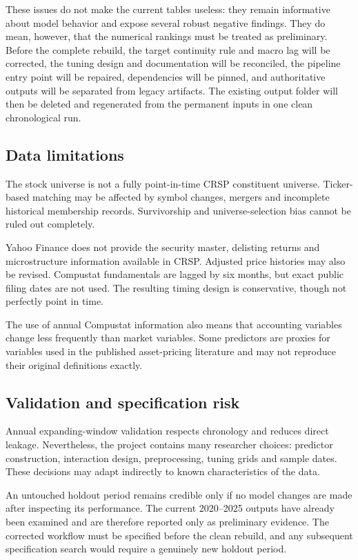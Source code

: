 \documentclass[11pt,a4paper]{article}
\begin{document}
These issues do not make the current tables useless: they remain informative
about model behavior and expose several robust negative findings. They do mean,
however, that the numerical rankings must be treated as preliminary. Before the
complete rebuild, the target continuity rule and macro lag will be corrected,
the tuning design and documentation will be reconciled, the pipeline entry
point will be repaired, dependencies will be pinned, and authoritative outputs
will be separated from legacy artifacts. The existing output folder will then
be deleted and regenerated from the permanent inputs in one clean chronological
run.

\subsection{Data limitations}

The stock universe is not a fully point-in-time CRSP constituent universe.
Ticker-based matching may be affected by symbol changes, mergers and incomplete
historical membership records. Survivorship and universe-selection bias cannot
be ruled out completely.

Yahoo Finance does not provide the security master, delisting returns and
microstructure information available in CRSP. Adjusted price histories may also
be revised. Compustat fundamentals are lagged by six months, but exact public
filing dates are not used. The resulting timing design is conservative, though
not perfectly point in time.

The use of annual Compustat information also means that accounting variables
change less frequently than market variables. Some predictors are proxies for
variables used in the published asset-pricing literature and may not reproduce
their original definitions exactly.

\subsection{Validation and specification risk}

Annual expanding-window validation respects chronology and reduces direct
leakage. Nevertheless, the project contains many researcher choices:
predictor construction, interaction design, preprocessing, tuning grids and
sample dates. These decisions may adapt indirectly to known characteristics of
the data.

An untouched holdout period remains credible only if no model changes are
made after inspecting its performance. The current 2020--2025 outputs have
already been examined and are therefore reported only as preliminary evidence.
The corrected workflow must be specified before the clean rebuild, and any
subsequent specification search would require a genuinely new holdout period.
\end{document}
